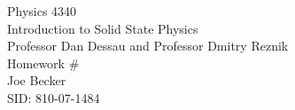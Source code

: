 \begin{titlepage}
\setlength{\topmargin}{1.5in}
\begin{center}
\Huge{Physics 4340} \\
\LARGE{Introduction to Solid State Physics} \\
\Large{Professor Dan Dessau and Professor Dmitry Reznik} \\[1cm]

\huge{Homework \#\HWnum}\\[0.5cm]

\large{Joe Becker} \\
\large{SID: 810-07-1484} \\
\large{\due} 

\end{center}

\end{titlepage}

